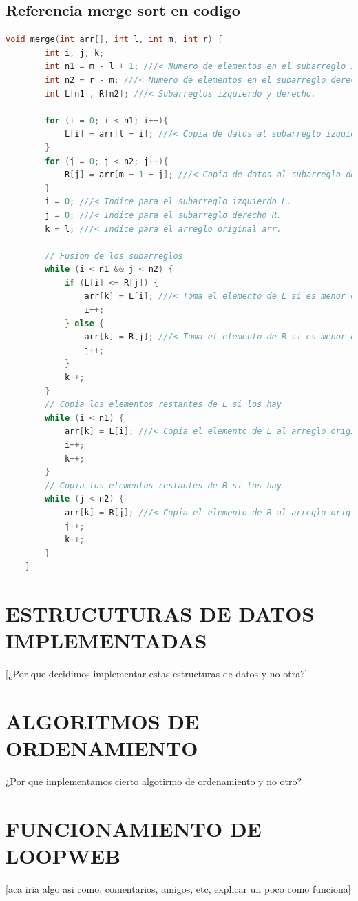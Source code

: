 \subsection*{Referencia merge sort en codigo}
\begin{lstlisting}[style=CodeStyle, language=C, caption={merge()}, label={lst:codigo}]
    void merge(int arr[], int l, int m, int r) {
        int i, j, k;
        int n1 = m - l + 1; ///< Numero de elementos en el subarreglo izquierdo.
        int n2 = r - m; ///< Numero de elementos en el subarreglo derecho.
        int L[n1], R[n2]; ///< Subarreglos izquierdo y derecho.
        
        for (i = 0; i < n1; i++){
            L[i] = arr[l + i]; ///< Copia de datos al subarreglo izquierdo.
        }
        for (j = 0; j < n2; j++){
            R[j] = arr[m + 1 + j]; ///< Copia de datos al subarreglo derecho.
        }
        i = 0; ///< Indice para el subarreglo izquierdo L.
        j = 0; ///< Indice para el subarreglo derecho R.
        k = l; ///< Indice para el arreglo original arr.
    
        // Fusion de los subarreglos 
        while (i < n1 && j < n2) {
            if (L[i] <= R[j]) {
                arr[k] = L[i]; ///< Toma el elemento de L si es menor o igual que el de R.
                i++;
            } else {
                arr[k] = R[j]; ///< Toma el elemento de R si es menor que el de L.
                j++;
            }
            k++;
        }
        // Copia los elementos restantes de L si los hay
        while (i < n1) {
            arr[k] = L[i]; ///< Copia el elemento de L al arreglo original.
            i++;
            k++;
        }
        // Copia los elementos restantes de R si los hay
        while (j < n2) {
            arr[k] = R[j]; ///< Copia el elemento de R al arreglo original.
            j++;
            k++;
        }
    }
\end{lstlisting}

\section{ESTRUCUTURAS DE DATOS IMPLEMENTADAS}
[¿Por que decidimos implementar estas estructuras de datos y no otra?]
\section{ALGORITMOS DE ORDENAMIENTO}
 ¿Por que implementamos cierto algotirmo de ordenamiento y no otro?
\section{FUNCIONAMIENTO DE LOOPWEB}
[aca iria algo asi como, comentarios, amigos, etc, explicar un poco como funciona]

